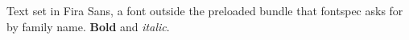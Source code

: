 \documentclass{article}
\begin{document}
Text set in Fira Sans, a font outside the preloaded bundle that fontspec asks for by family name.
\textbf{Bold} and \textit{italic}.
\end{document}
